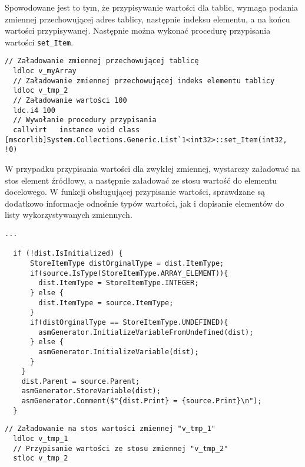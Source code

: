\par Spowodowane jest to tym, że przypisywanie wartości dla tablic, wymaga podania zmiennej przechowującej adres tablicy, następnie indeksu elementu, a na końcu wartości przypisywanej. Następnie można wykonać procedurę przypisania wartości \texttt{set\_Item}.

\begin{lstlisting}[language=IL, caption=Kod assemblera przedstawiający przypisanie wartości do elementu tablicowego, label=alg:assign3]
  // Załadowanie zmiennej przechowującej tablicę
  ldloc v_myArray
  // Załadowanie zmiennej przechowującej indeks elementu tablicy
  ldloc v_tmp_2
  // Załadowanie wartości 100
  ldc.i4 100
  // Wywołanie procedury przypisania
  callvirt   instance void class [mscorlib]System.Collections.Generic.List`1<int32>::set_Item(int32, !0)
\end{lstlisting}

\par W przypadku przypisania wartości dla zwykłej zmiennej, wystarczy załadować na stos element źródłowy, a następnie załadować ze stosu wartość do elementu docelowego. W funkcji obsługującej przypisanie wartości, sprawdzane są dodatkowo informacje odnośnie typów wartości, jak i dopisanie elementów do listy wykorzystywanych zmiennych.

\begin{lstlisting}[language=CSharp, caption={Implementacja funkcji obsługującej przypisanie wartości cz.2}, label=alg:assign4]
  ...

  if (!dist.IsInitialized) {
      StoreItemType distOrginalType = dist.ItemType;
      if(source.IsType(StoreItemType.ARRAY_ELEMENT)){
        dist.ItemType = StoreItemType.INTEGER;
      } else {
        dist.ItemType = source.ItemType;
      }
      if(distOrginalType == StoreItemType.UNDEFINED){
        asmGenerator.InitializeVariableFromUndefined(dist);
      } else {
        asmGenerator.InitializeVariable(dist);
      }
    }
    dist.Parent = source.Parent;
    asmGenerator.StoreVariable(dist);
    asmGenerator.Comment($"{dist.Print} = {source.Print}\n");
  }
\end{lstlisting}

\begin{lstlisting}[language=IL, caption=Kod assemblera przedstawiający przypisanie wartości, label=alg:assign5]
  // Załadowanie na stos wartości zmiennej "v_tmp_1"
  ldloc v_tmp_1
  // Przypisanie wartości ze stosu zmiennej "v_tmp_2"
  stloc v_tmp_2
\end{lstlisting}

